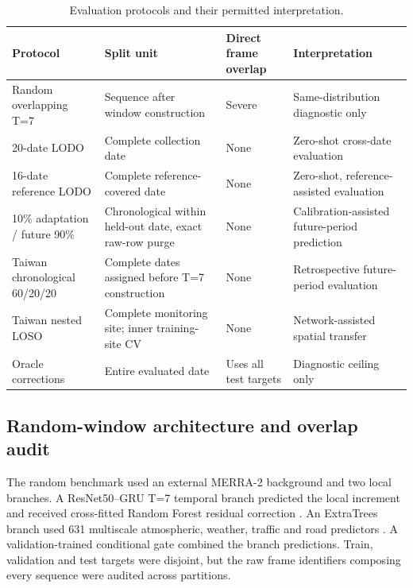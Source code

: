 \documentclass[review,12pt,authoryear]{elsarticle}
\begin{document}
\begin{table}[H]
\centering
\caption{Evaluation protocols and their permitted interpretation.}
\label{tab:protocols}
\begin{adjustbox}{max width=\textwidth}
\begin{tabular}{P{3.0cm}P{3.2cm}P{2.7cm}P{5.3cm}}
\toprule
Protocol & Split unit & Direct frame overlap & Interpretation \\
\midrule
Random overlapping T=7 & Sequence after window construction & Severe & Same-distribution diagnostic only \\
20-date LODO & Complete collection date & None & Zero-shot cross-date evaluation \\
16-date reference LODO & Complete reference-covered date & None & Zero-shot, reference-assisted evaluation \\
10\% adaptation / future 90\% & Chronological within held-out date, exact raw-row purge & None & Calibration-assisted future-period prediction \\
Taiwan chronological 60/20/20 & Complete dates assigned before T=7 construction & None & Retrospective future-period evaluation \\
Taiwan nested LOSO & Complete monitoring site; inner training-site CV & None & Network-assisted spatial transfer \\
Oracle corrections & Entire evaluated date & Uses all test targets & Diagnostic ceiling only \\
\bottomrule
\end{tabular}
\end{adjustbox}
\end{table}

\subsection{Random-window architecture and overlap audit}

The random benchmark used an external MERRA-2 background and two local
branches. A ResNet50--GRU T=7 temporal branch predicted the local increment and
received cross-fitted Random Forest residual correction
\citep{he2016resnet,cho2014gru,breiman2001rf}. An ExtraTrees branch used 631
multiscale atmospheric, weather, traffic and road predictors
\citep{geurts2006extratrees}. A validation-trained conditional gate combined
the branch predictions. Train, validation and test targets were disjoint, but
the raw frame identifiers composing every sequence were audited across
partitions.
\end{document}
